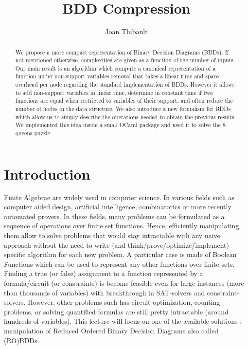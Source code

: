 \documentclass[a4paper,10pt]{article}
\title{BDD Compression}
\author{Joan Thibault}
\begin{document}
\maketitle
\begin{abstract}
We propose a more compact representation of Binary Decision Diagrams \cite{Bryant1986}\cite{Somenzi1999} (BDDs).
If not mentioned otherwise, complexities are given as a function of the number of inputs.
Our main result is an algorithm which compute a canonical representation of a function under non-support variables removal that takes a linear time and space overhead per node regarding the standard implementation of BDDs.
However it allows to add non-support variables in linear time, determine in constant time if two functions are equal when restricted to variables of their support, and often reduce the number of nodes in the data structure.
We also introduce a new formalism for BDDs which allow us to simply describe the operations needed to obtain the previous results.
We implemented this idea inside a small OCaml package and used it to solve the 8-queens puzzle \cite{queen8}.
\end{abstract}


\newpage
\tableofcontents
\newpage
\newcommand{\shannon}[3]{#1 \longrightarrow_S #2, #3}
\newcommand{\B}{\mathbb{B}}%

\section{Introduction}
Finite Algebrae are widely used in computer science.
In various fields such as computer aided design, artificial intelligence, combinatorics or more recently automated provers.
In these fields, many problems can be formulated as a sequence of operations over finite set functions. Hence, efficiently manipulating them allow to solve problems that would stay intractable with any naive approach without the need to write (and think/prove/optimize/implement) specific algorithm for each new problem.
A particular case is made of Boolean Functions which can be used to represent any other functions over finite sets.
Finding a true (or false) assignment to a function represented by a formula/circuit (or constraints) is become feasible even for large instances (more than thousands of variables) with breakthrough in SAT-solvers and constraint-solvers.
However, other problems such has circuit optimization, counting problems, or solving quantified formulas are still pretty intractable (around hundreds of variables).
This lecture will focus on one of the available solutions : manipulation of Reduced Ordered Binary Decision Diagrams also called (RO)BDDs.
\end{document}
